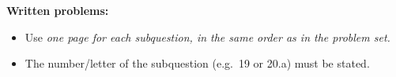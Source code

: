{\bf Written problems:} 
\begin{itemize}
    \item Use \emph{one page for each subquestion, in the same order as in the problem set.}
    \item The number/letter of the subquestion (e.g.\ 19 or 20.a) must be stated.
\end{itemize}
